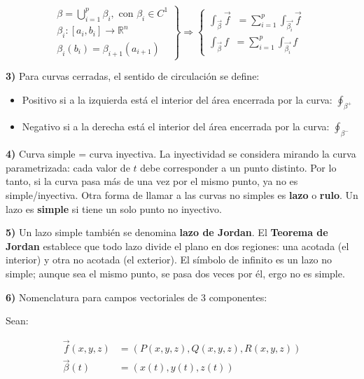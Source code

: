 \documentclass{article}
\renewcommand{\Bbb}{\mathbb}
\begin{document}
\begin{equation}
\left.
\begin{array}{ll}
\beta = \bigcup\limits_{i=1}^p \beta_i, \text{ con } \beta_i \in C^1 \\
\beta_i: [a_i, b_i] \rightarrow \Bbb R^n \\
\beta_{i}(b_i) = \beta_{i+1}(a_{i+1})
\end{array}
\right\} \Rightarrow
\left\{
\begin{array}{ll}
\int_{\overrightarrow{\beta}} \overrightarrow{f} \mathop{\overrightarrow{d\beta}} = \sum\limits_{i=1}^p \int_{\overrightarrow{\beta_i}} \overrightarrow{f} \mathop{\overrightarrow{d\beta_i}} \\
\int_{\overrightarrow{\beta}} f \mathop{\overrightarrow{d\beta}} = \sum\limits_{i=1}^p \int_{\overrightarrow{\beta_i}} f \mathop{\overrightarrow{d\beta_i}}
\end{array}
\right.
\end{equation}

\textbf{3)} Para curvas cerradas, el sentido de circulación se define:

\begin{itemize}
\item Positivo si a la izquierda está el interior del área encerrada por la curva: $\oint_{\beta^+}$
\item Negativo si a la derecha está el interior del área encerrada por la curva: $\oint_{\beta^-}$
\end{itemize}

\textbf{4)} Curva simple = curva inyectiva. La inyectividad se considera mirando la curva parametrizada: cada valor de $t$ debe corresponder a un punto distinto. Por lo tanto, si la curva pasa más de una vez por el mismo punto, ya no es simple/inyectiva. Otra forma de llamar a las curvas no simples es \textbf{lazo} o \textbf{rulo}. Un lazo es \textbf{simple} si tiene un solo punto no inyectivo.

\textbf{5)} Un lazo simple también se denomina \textbf{lazo de Jordan}. El \textbf{Teorema de Jordan} establece que todo lazo divide el plano en dos regiones: una acotada (el interior) y otra no acotada (el exterior). El símbolo de infinito es un lazo no simple; aunque sea el mismo punto, se pasa dos veces por él, ergo no es simple.

\textbf{6)} Nomenclatura para campos vectoriales de 3 componentes:

Sean:

\begin{subequations}
\begin{align}
\overrightarrow{f}(x, y, z) &= (P(x,y,z), Q(x,y,z), R(x, y, z)) \\
\overrightarrow{\beta}(t) &= (x(t), y(t), z(t))
\end{align}
\end{subequations}
\end{document}
